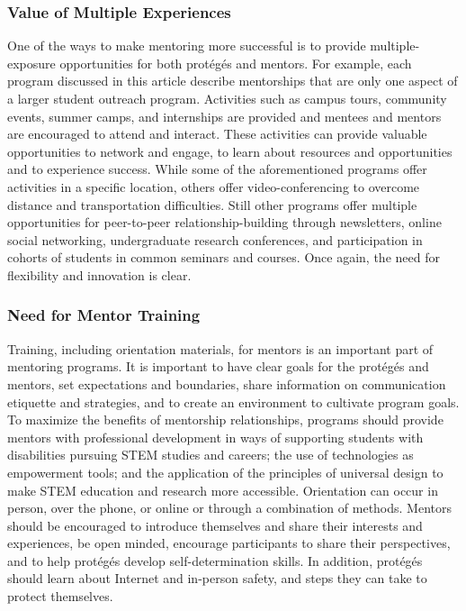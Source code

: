 \documentclass[11.5pt]{sig-alternate} %
\begin{document}
\begin{large}
\subsubsection*{Value of Multiple Experiences}
One of the ways to make mentoring more successful is to provide multiple-exposure opportunities for both protégés and mentors. For example, each program discussed in this article describe mentorships that are only one aspect of a larger student outreach program. Activities such as campus tours, community events, summer camps, and internships are provided and mentees and mentors are encouraged to attend and interact. These activities can provide valuable opportunities to network and engage, to learn about resources and opportunities and to experience success. While some of the aforementioned programs offer activities in a specific location, others offer video-conferencing to overcome distance and transportation difficulties. Still other programs offer multiple opportunities for peer-to-peer relationship-building through newsletters, online social networking, undergraduate research conferences, and participation in cohorts of students in common seminars and courses. Once again, the need for flexibility and innovation is clear.

\subsubsection*{Need for Mentor Training}
Training, including orientation materials, for mentors is an important part of mentoring programs. It is important to have clear goals for the protégés and mentors, set expectations and boundaries, share information on communication etiquette and strategies, and to create an environment to cultivate program goals. To maximize the benefits of mentorship relationships, programs should provide mentors with professional development in ways of supporting students with disabilities pursuing STEM studies and careers; the use of technologies as empowerment tools; and the application of the principles of universal design to make STEM education and research more accessible. Orientation can occur in person, over the phone, or online or through a combination of methods. Mentors should be encouraged to introduce themselves and share their interests and experiences, be open minded, encourage participants to share their perspectives, and to help protégés develop self-determination skills. In addition, protégés should learn about Internet and in-person safety, and steps they can take to protect themselves.


\end{large}
\end{document}
